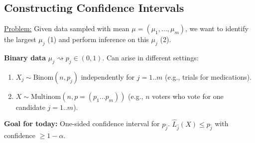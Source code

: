 \subsection{Constructing Confidence Intervals}

\underline{Problem:} Given data sampled with mean $\mu = (\mu_1, \dots, \mu_m)$, we want to identify the largest $\mu_j$ (1) and perform inference on this $\mu_j$ (2).

\noindent \textbf{Binary data} $\mu_j \rightsquigarrow p_j \in (0,1)$. Can arise in different settings:
\begin{enumerate}
    \item $X_j \sim \text{Binom}(n, p_j)$ independently for $j=1..m$ (e.g., trials for medications).
    \item $X \sim \text{Multinom}(n, p=(p_1 \dots p_m))$ (e.g., $n$ voters who vote for one candidate $j=1..m$).
\end{enumerate}

\noindent \textbf{Goal for today:} One-sided confidence interval for $p_{\hat{j}}$. $\hat{L}_{\hat{j}}(X) \le p_{\hat{j}}$ with confidence $\ge 1-\alpha$.

